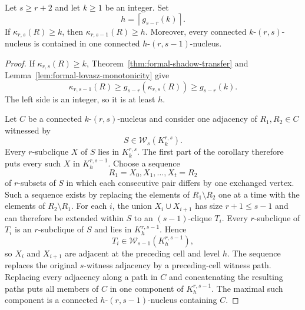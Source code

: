 \begin{corollary}
\label{cor:formal-cross-cell-nesting}
Let $s\geq r+2$ and let $k\geq1$ be an integer.
%
Set
\[
h=\left\lceil g_{s-r}(k)\right\rceil.
\]
If $\kappa_{r,s}(R)\geq k$, then $\kappa_{r,s-1}(R)\geq h$.
%
Moreover, every connected $k$-$(r,s)$-nucleus is contained in one connected $h$-$(r,s-1)$-nucleus.
\end{corollary}
\begin{proof}
If $\kappa_{r,s}(R)\geq k$, Theorem~\ref{thm:formal-shadow-transfer} and Lemma~\ref{lem:formal-lovasz-monotonicity} give
\[
\kappa_{r,s-1}(R)
\geq g_{s-r}(\kappa_{r,s}(R))
\geq g_{s-r}(k).
\]
The left side is an integer, so it is at least $h$.

Let $C$ be a connected $k$-$(r,s)$-nucleus and consider one adjacency of $R_1,R_2\in C$ witnessed by
\[
S\in\mathcal W_s(K_k^{r,s}).
\]
Every $r$-subclique $X$ of $S$ lies in $K_k^{r,s}$.
%
The first part of the corollary therefore puts every such $X$ in $K_h^{r,s-1}$.
%
Choose a sequence
\[
R_1=X_0,X_1,\ldots,X_t=R_2
\]
of $r$-subsets of $S$ in which each consecutive pair differs by one exchanged vertex.
%
Such a sequence exists by replacing the elements of $R_1\setminus R_2$ one at a time with the elements of $R_2\setminus R_1$.
%
For each $i$, the union $X_i\cup X_{i+1}$ has size $r+1\leq s-1$ and can therefore be extended within $S$ to an $(s-1)$-clique $T_i$.
%
Every $r$-subclique of $T_i$ is an $r$-subclique of $S$ and lies in $K_h^{r,s-1}$.
%
Hence
\[
T_i\in\mathcal W_{s-1}(K_h^{r,s-1}),
\]
so $X_i$ and $X_{i+1}$ are adjacent at the preceding cell and level $h$.
%
The sequence replaces the original $s$-witness adjacency by a preceding-cell witness path.
%
Replacing every adjacency along a path in $C$ and concatenating the resulting paths puts all members of $C$ in one component of $K_h^{r,s-1}$.
%
The maximal such component is a connected $h$-$(r,s-1)$-nucleus containing $C$.
\end{proof}
